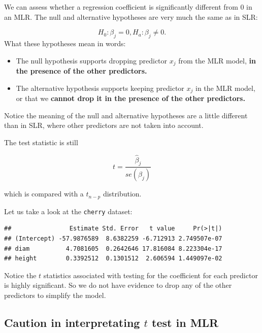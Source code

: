 \documentclass[
]{book}
\newenvironment{Shaded}{\begin{snugshade}}{\end{snugshade}}
\newcommand{\FunctionTok}[1]{\textcolor[rgb]{0.13,0.29,0.53}{\textbf{#1}}}
\newcommand{\NormalTok}[1]{#1}
\newcommand{\SpecialCharTok}[1]{\textcolor[rgb]{0.81,0.36,0.00}{\textbf{#1}}}
\providecommand{\tightlist}{%
  \setlength{\itemsep}{0pt}\setlength{\parskip}{0pt}}
\begin{document}
We can assess whether a regression coefficient is significantly different from 0 in an MLR. The null and alternative hypotheses are very much the same as in SLR:

\[
H_0: \beta_j = 0, H_a: \beta_j \neq 0.
\]
What these hypotheses mean in words:

\begin{itemize}
\tightlist
\item
  The null hypothesis supports dropping predictor \(x_j\) from the MLR model, \textbf{in the presence of the other predictors.}
\item
  The alternative hypothesis supports keeping predictor \(x_j\) in the MLR model, or that we \textbf{cannot drop it in the presence of the other predictors.}
\end{itemize}

Notice the meaning of the null and alternative hypotheses are a little different than in SLR, where other predictors are not taken into account.

The test statistic is still

\begin{equation} 
t = \frac{\hat{\beta}_j}{se(\hat{\beta}_j)}
\label{eq:6ttest}
\end{equation}

which is compared with a \(t_{n-p}\) distribution.

Let us take a look at the \texttt{cherry} dataset:

\begin{Shaded}
\end{Shaded}

\begin{verbatim}
##                Estimate Std. Error   t value     Pr(>|t|)
## (Intercept) -57.9876589  8.6382259 -6.712913 2.749507e-07
## diam          4.7081605  0.2642646 17.816084 8.223304e-17
## height        0.3392512  0.1301512  2.606594 1.449097e-02
\end{verbatim}

Notice the \(t\) statistics associated with testing for the coefficient for each predictor is highly significant. So we do not have evidence to drop any of the other predictors to simplify the model.

\hypertarget{caution-in-interpretating-t-test-in-mlr}{%
\subsection{\texorpdfstring{Caution in interpretating \(t\) test in MLR}{Caution in interpretating t test in MLR}}\label{caution-in-interpretating-t-test-in-mlr}}
\end{document}
